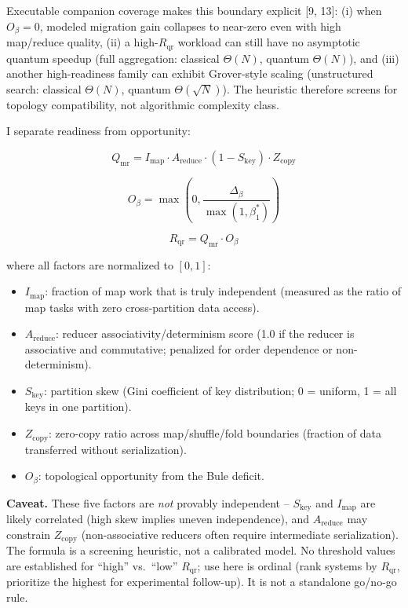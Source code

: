 \documentclass[
  11pt,
]{article}
\begin{document}
Executable companion coverage makes this boundary explicit {[}9, 13{]}:
(i) when \(O_\beta = 0\), modeled migration gain collapses to near-zero
even with high map/reduce quality, (ii) a high-\(R_{\text{qr}}\)
workload can still have no asymptotic quantum speedup (full aggregation:
classical \(\Theta(N)\), quantum \(\Theta(N)\)), and (iii) another
high-readiness family can exhibit Grover-style scaling (unstructured
search: classical \(\Theta(N)\), quantum \(\Theta(\sqrt{N})\)). The
heuristic therefore screens for topology compatibility, not algorithmic
complexity class.

I separate readiness from opportunity:

\[
Q_{\text{mr}} = I_{\text{map}} \cdot A_{\text{reduce}} \cdot (1 - S_{\text{key}}) \cdot Z_{\text{copy}}
\]

\[
O_{\beta} = \max\left(0, \frac{\Delta_\beta}{\max(1,\beta_1^*)}\right)
\]

\[
R_{\text{qr}} = Q_{\text{mr}} \cdot O_{\beta}
\]

where all factors are normalized to \([0,1]\):

\begin{itemize}
\item
  \(I_{\text{map}}\): fraction of map work that is truly independent
  (measured as the ratio of map tasks with zero cross-partition data
  access).
\item
  \(A_{\text{reduce}}\): reducer associativity/determinism score (1.0 if
  the reducer is associative and commutative; penalized for order
  dependence or non-determinism).
\item
  \(S_{\text{key}}\): partition skew (Gini coefficient of key
  distribution; 0 = uniform, 1 = all keys in one partition).
\item
  \(Z_{\text{copy}}\): zero-copy ratio across map/shuffle/fold
  boundaries (fraction of data transferred without serialization).
\item
  \(O_{\beta}\): topological opportunity from the Bule deficit.
\end{itemize}

\textbf{Caveat.} These five factors are \emph{not} provably independent
-- \(S_{\text{key}}\) and \(I_{\text{map}}\) are likely correlated (high
skew implies uneven independence), and \(A_{\text{reduce}}\) may
constrain \(Z_{\text{copy}}\) (non-associative reducers often require
intermediate serialization). The formula is a screening heuristic, not a
calibrated model. No threshold values are established for ``high''
vs.~``low'' \(R_{\text{qr}}\); use here is ordinal (rank systems by
\(R_{\text{qr}}\), prioritize the highest for experimental follow-up).
It is not a standalone go/no-go rule.
\end{document}
